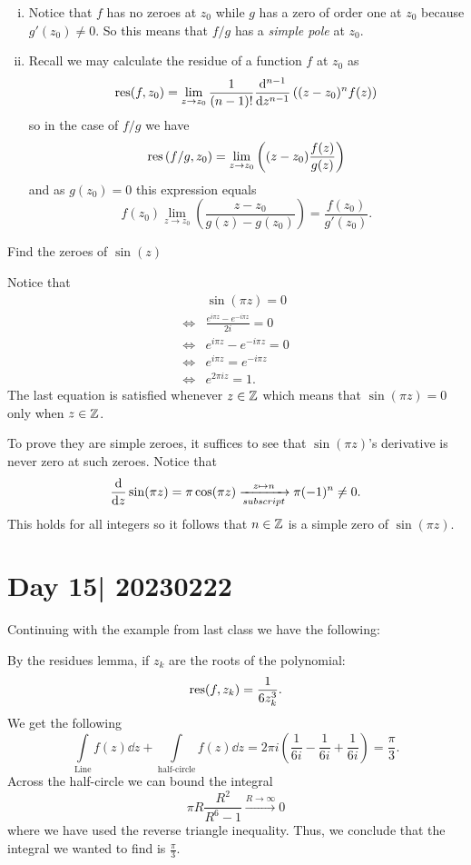 \documentclass[12pt]{memoir}
\begin{document}
\begin{ptcbr}
    \begin{enumerate}[i)]
        \itemsep=-0.4em
        \item Notice that $f$ has no zeroes at $z_0$ while $g$ has a zero of order one at $z_0$ because $g'(z_0)\neq 0$. So this means that $f/g$ has a \emph{simple pole} at $z_0$. 
        \item Recall we may calculate the residue of a function $f$ at $z_0$ as 
        $$\operatorname*{res}(f,z_0)=\lim_{z\to z_0}\frac{1}{(n-1)!}\dv[n-1]{z}\left((z-z_0)^nf(z)\right)$$
        so in the case of $f/g$ we have 
        $$\operatorname*{res}\left(f/g,z_0\right)=\lim_{z\to z_0}\left((z-z_0)\frac{f(z)}{g(z)}\right)$$
        and as $g(z_0)=0$ this expression equals 
        $$f(z_0)\lim_{z\to z_0}\left(\frac{z-z_0}{g(z)-g(z_0)}\right)=\frac{f(z_0)}{g'(z_0)}.$$
    \end{enumerate}
\end{ptcbr}

\begin{Ej}
    Find the zeroes of $\sin(z)$
\end{Ej}

\begin{ptcbr}
    Notice that 
    \begin{align*}
        &\sin(\pi z)=0\\
        \iff&\frac{e^{i\pi z}-e^{-i\pi z}}{2i}=0\\
        \iff&e^{i\pi z}-e^{-i\pi z}=0\\
        \iff&e^{i\pi z}=e^{-i\pi z}\\
        \iff&e^{2\pi i z}=1.
    \end{align*}
    The last equation is satisfied whenever $z\in\mathbb{Z}$ which means that $\sin(\pi z)=0$ only when $z\in\mathbb{Z}$.\par 
    To prove they are simple zeroes, it suffices to see that $\sin(\pi z)$'s derivative is never zero at such zeroes. Notice that 
    $$\dv{z}\sin(\pi z)=\pi\cos(\pi z)\xrightarrow[subscript]{z\mapsto n}\pi (-1)^n\neq 0.$$
    This holds for all integers so it follows that $n\in\mathbb{Z}$ is a simple zero of $\sin(\pi z)$.
\end{ptcbr}
\section{Day 15| 20230222}

Continuing with the example from last class we have the following:

\begin{ptcb}
    By the residues lemma, if $z_k$ are the roots of the polynomial:
    $$\operatorname*{res}(f,z_k)=\frac{1}{6z_k^3}.$$
    We get the following 
    $$\int\limits_{\text{Line}}f(z)\dd z+\int\limits_{\text{half-circle}}f(z)\dd z=2\pi i\left(\frac{1}{6i}-\frac{1}{6i}+\frac{1}{6i}\right)=\frac{\pi}{3}.$$
    Across the half-circle we can bound the integral 
    $$\pi R\frac{R^2}{R^6-1}\xrightarrow[]{R\to\infty
    }0$$
    where we have used the reverse triangle inequality. Thus, we conclude that the integral we wanted to find is $\frac{\pi}{3}$.
\end{ptcb}
\end{document}
